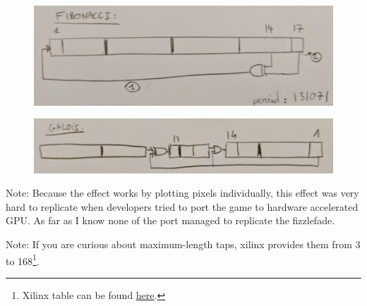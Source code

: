 \begin{figure}[H] \centering \includegraphics[width=\textwidth]{imgs/fizzlefade/fibonnaci.png} \end{figure}
\begin{figure}[H] \centering \includegraphics[width=\textwidth]{imgs/fizzlefade/galois.png} \end{figure}
      
Note: Because the effect works by plotting pixels individually, this effect was very hard to replicate when developers tried to port the game to hardware accelerated GPU. As far as I know none of the port managed to replicate the fizzlefade.

Note: If you are curious about maximum-length taps, xilinx provides them from 3 to 168\footnote{Xilinx table can be found \href{http://www.xilinx.com/support/documentation/application\_notes/xapp052.pdf}{here}.}.










